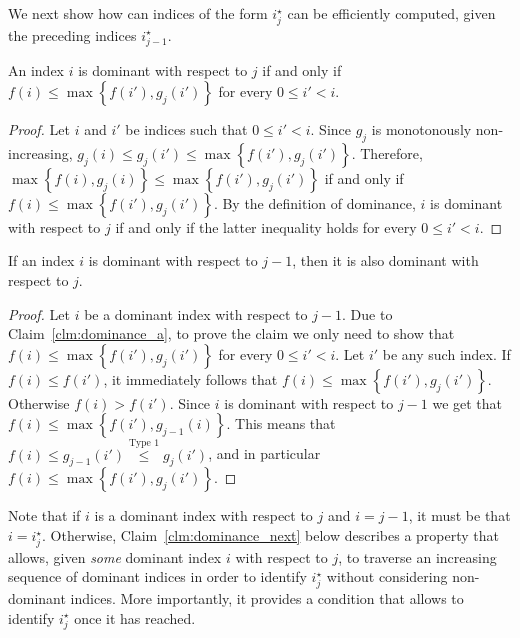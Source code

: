 We next show how can indices of the form $i^\star_j$ can be efficiently computed, given the preceding indices $i^\star_{j-1}$.

\begin{claim}
	\label{clm:dominance_a}
	An index $i$ is dominant with respect to $j$ if and only if $f(i) \leq \max\left\{f(i'), g_j(i')\right\}$ for every $0 \leq i' < i$.
\end{claim}

\begin{proof}
	Let $i$ and $i'$ be indices such that $0 \leq i' < i$.
	Since $g_j$ is monotonously non-increasing, $g_j(i) \leq g_j(i') \leq \max\left\{f(i'), g_j(i')\right\}$. Therefore, $\max\left\{f(i), g_j(i)\right\} \leq \max\left\{f(i'), g_j(i')\right\}$ if and only if $f(i) \leq \max\left\{f(i'), g_j(i')\right\}$. By the definition of dominance, $i$ is dominant with respect to $j$ if and only if the latter inequality holds for every $0 \leq i' < i$.
\end{proof}

\begin{claim}
	\label{clm:dominance_b}
	If an index $i$ is dominant with respect to $j-1$, then it is also dominant with respect to $j$.
\end{claim}

\begin{proof}
	Let $i$ be a dominant index with respect to $j-1$. Due to Claim~\ref{clm:dominance_a}, to prove the claim we only need to show that $f(i) \leq \max\left\{f(i'), g_j(i')\right\}$ for every $0 \leq i' < i$.
	Let $i'$ be any such index.
	If $f(i) \leq f(i')$, it immediately follows that $f(i) \leq \max\left\{f(i'), g_j(i')\right\}$.
	Otherwise  $f(i) > f(i')$. Since $i$ is dominant with respect to $j-1$ we get that $f(i) \leq \max\left\{f(i'), g_{j-1}(i)\right\}$. This means that $f(i) \leq g_{j-1}(i') \stackrel{\text{Type 1}}{\leq} g_j(i')$, and in particular $f(i) \leq \max\left\{f(i'), g_j(i')\right\}$.
\end{proof}


Note that if $i$ is a dominant index with respect to $j$ and $i = j-1$, it must be that $i = i^\star_j$. Otherwise, Claim~\ref{clm:dominance_next} below describes a property that allows, given \emph{some} dominant index $i$ with respect to $j$, to traverse an increasing sequence of dominant indices in order to identify $i^\star_j$ without considering non-dominant indices. More importantly, it provides a condition that allows to identify $i^\star_j$ once it has reached.

